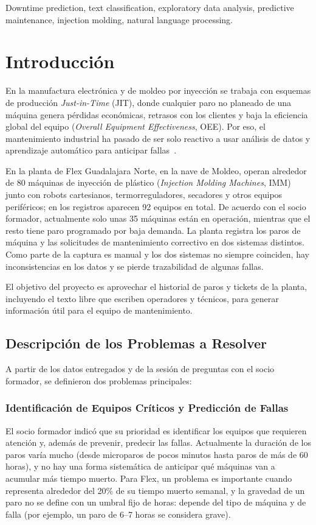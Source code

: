 \documentclass[conference]{IEEEtran}
\begin{document}
\begin{IEEEkeywords}
Downtime prediction, text classification, exploratory data analysis, predictive maintenance, injection molding, natural language processing.
\end{IEEEkeywords}

\section{Introducción}
En la manufactura electrónica y de moldeo por inyección se trabaja con esquemas de producción \textit{Just-in-Time} (JIT), donde cualquier paro no planeado de una máquina genera pérdidas económicas, retrasos con los clientes y baja la eficiencia global del equipo (\textit{Overall Equipment Effectiveness}, OEE). Por eso, el mantenimiento industrial ha pasado de ser solo reactivo a usar análisis de datos y aprendizaje automático para anticipar fallas~\cite{mobley2002,jardine2006}.

En la planta de Flex Guadalajara Norte, en la nave de Moldeo, operan alrededor de 80 máquinas de inyección de plástico (\textit{Injection Molding Machines}, IMM) junto con robots cartesianos, termorreguladores, secadores y otros equipos periféricos; en los registros aparecen 92 equipos en total. De acuerdo con el socio formador, actualmente solo unas 35 máquinas están en operación, mientras que el resto tiene paro programado por baja demanda. La planta registra los paros de máquina y las solicitudes de mantenimiento correctivo en dos sistemas distintos. Como parte de la captura es manual y los dos sistemas no siempre coinciden, hay inconsistencias en los datos y se pierde trazabilidad de algunas fallas.

El objetivo del proyecto es aprovechar el historial de paros y tickets de la planta, incluyendo el texto libre que escriben operadores y técnicos, para generar información útil para el equipo de mantenimiento.

\subsection{Descripción de los Problemas a Resolver}
A partir de los datos entregados y de la sesión de preguntas con el socio formador, se definieron dos problemas principales:

\subsubsection{Identificación de Equipos Críticos y Predicción de Fallas}
El socio formador indicó que su prioridad es identificar los equipos que requieren atención y, además de prevenir, predecir las fallas. Actualmente la duración de los paros varía mucho (desde microparos de pocos minutos hasta paros de más de 60 horas), y no hay una forma sistemática de anticipar qué máquinas van a acumular más tiempo muerto. Para Flex, un problema es importante cuando representa alrededor del 20\% de su tiempo muerto semanal, y la gravedad de un paro no se define con un umbral fijo de horas: depende del tipo de máquina y de falla (por ejemplo, un paro de 6--7 horas se considera grave).
\end{document}
